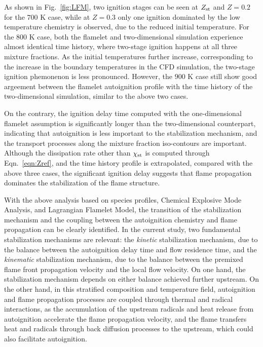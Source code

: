 \documentclass[review,3p,times]{elsarticleUS}
\begin{document}
As shown in Fig.~\ref{fig:LFM}, two ignition stages can be seen at $Z_{\rm st}$ and $Z = 0.2$ for the $700$ K case, while at $Z = 0.3$ only one ignition dominated by the low temperature chemistry is observed, due to the reduced initial temperature.   For the $800$ K case, both the flamelet and two-dimensional simulation experience almost identical time history, where two-stage ignition happens at all three mixture fractions.  As the initial temperatures further increase, corresponding to the increase in the boundary temperatures in the CFD simulation, the two-stage ignition phemonenon is less pronounced.  However, the $900$ K case still show good argeement between the flamelet autoignition profile with the time history of the two-dimensional simulation, similar to the above two cases.  

On the contrary, the ignition delay time computed with the one-dimensional flamelet assumption is significantly longer than the two-dimensional counterpart, indicating that autoignition is less important to the stabilization mechanism, and the transport processes along the mixture fraction iso-contours are important.  Although the dissipation rate other than $\chi_{\rm st}$ is computed through Eqn.~\ref{eqn:Zref}, and the time history profile is extrapolated, compared with the above three cases, the significant ignition delay suggests that flame propagation dominates the stabilization of the flame structure.       

With the above analysis based on species profiles, Chemical Explosive Mode Analysis, and Lagrangian Flamelet Model, the transition of the stabilization mechanism and the coupling between the autoignition chemistry and flame propagation can be clearly identified.  In the current study, two fundamental stabilization mechanisms are relevant: the \emph {kinetic} stabilization mechanism, due to the balance between the autoignition delay time and flow residence time, and the \emph {kinematic} stabilization mechanism, due to the balance between the premixed flame front propagation velocity and the local flow velocity.  On one hand, the stabilization mechanism depends on either balance achieved further upstream.  On the other hand, in this stratified composition and temperature field, autoignition and flame propagation processes are coupled through thermal and radical interactions, as the accumulation of the upstream radicals and heat release from autoignition accelerate the flame propagation velocity, and the flame transfers heat and radicals through back diffusion processes to the upstream, which could also facilitate autoignition.
\end{document}
